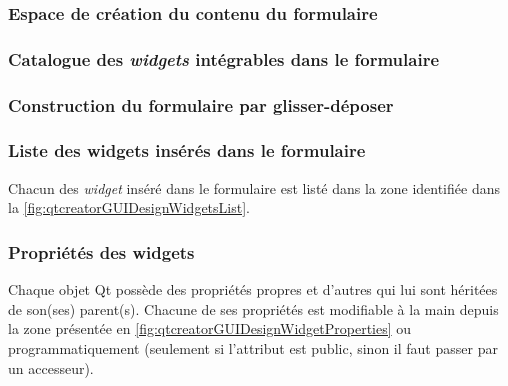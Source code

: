 \documentclass[12pt,a4paper,oneside,titlepage,final]{article}
\begin{document}

\subsubsection{Espace de création du contenu du formulaire}
\label{sec:concevoirGUIformulaire}


\subsubsection{Catalogue des \emph{widgets} intégrables dans le
  formulaire}
\label{sec:concevoirGUIwidgetsCatalogue}


\subsubsection{Construction du formulaire par glisser-déposer}
\label{sec:concevoirGUIDragDrop}


\subsubsection{Liste des widgets insérés dans le formulaire}
\label{sec:concevoirGUIwidgetsList}
Chacun des \emph{widget} inséré dans le formulaire est listé dans la
zone identifiée dans la \figurename
\vref{fig:qtcreatorGUIDesignWidgetsList}.


\subsubsection{Propriétés des widgets}
\label{sec:concevoirGUIwidgetProperties}
Chaque objet \gls{Qt} possède des propriétés propres et d'autres qui
lui sont héritées de son(ses) parent(s). Chacune de ses propriétés est
modifiable à la main depuis la zone présentée en \figurename
\vref{fig:qtcreatorGUIDesignWidgetProperties} ou programmatiquement
(seulement si l'attribut est public, sinon il faut passer par un
accesseur).
\end{document}
